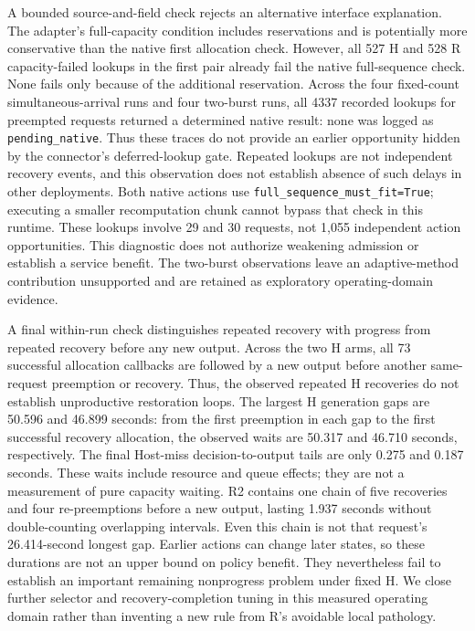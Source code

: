 \documentclass[10pt,a4paper]{article}
\begin{document}
A bounded source-and-field check rejects an alternative interface explanation.
The adapter's full-capacity condition includes reservations and is potentially
more conservative than the native first allocation check. However, all 527 H
and 528 R capacity-failed lookups in the first pair already fail the native
full-sequence check. None fails only because of the additional reservation.
Across the four fixed-count simultaneous-arrival runs and four two-burst runs,
all 4337 recorded lookups for preempted requests returned a determined native
result: none was logged as \texttt{pending\_native}. Thus these traces do not
provide an earlier opportunity hidden by the connector's deferred-lookup gate.
Repeated lookups are not independent recovery events, and this observation
does not establish absence of such delays in other deployments.
Both native actions use \texttt{full\_sequence\_must\_fit=True}; executing a
smaller recomputation chunk cannot bypass that check in this runtime. These
lookups involve 29 and 30 requests, not 1,055 independent action opportunities.
This diagnostic does not authorize weakening admission or establish a service
benefit. The two-burst observations leave an adaptive-method contribution
unsupported and are retained as exploratory operating-domain evidence.

A final within-run check distinguishes repeated recovery with progress from
repeated recovery before any new output. Across the two H arms, all 73
successful allocation callbacks are followed by a new output before another
same-request preemption or recovery. Thus, the observed repeated H recoveries
do not establish unproductive restoration loops. The largest H generation
gaps are 50.596 and 46.899 seconds: from the first preemption in each gap to
the first successful recovery allocation, the observed waits are 50.317 and
46.710 seconds, respectively. The final Host-miss decision-to-output tails
are only 0.275 and 0.187 seconds. These waits include resource and queue effects;
they are not a measurement of pure capacity waiting. R2 contains one chain
of five recoveries and four re-preemptions before a new output, lasting 1.937
seconds without double-counting overlapping intervals. Even this chain is
not that request's 26.414-second longest gap. Earlier actions can change later
states, so these durations are not an upper bound on policy benefit. They
nevertheless fail to establish an important remaining nonprogress problem
under fixed H. We close further selector and recovery-completion tuning in
this measured operating domain rather than inventing a new rule from R's
avoidable local pathology.
\end{document}
